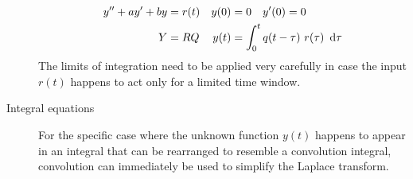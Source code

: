 \begin{description}
        \begin{align}
            y'' + ay' + by & = r(t) & y(0) & = 0 \quad y'(0) = 0                 \\
            Y              & = RQ   & y(t) & = \int_{0}^{t} q(t - \tau)\ r(\tau)
            \ \dl \tau
        \end{align}
        The limits of integration need to be applied very carefully in case the input
        $ r(t) $ happens to act only for a limited time window.
    \item[Integral equations] For the specific case where the unknown function $ y(t) $
        happens to appear in an integral that can be rearranged to resemble a convolution
        integral, convolution can immediately be used to simplify the Laplace transform.
\end{description}

